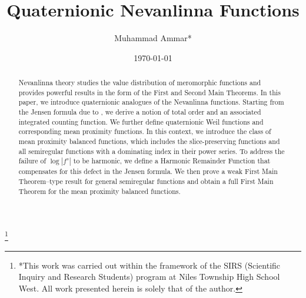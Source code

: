 \documentclass{amsart}
\begin{document}

\title{
Quaternionic Nevanlinna Functions}
 \author[M. Ammar]
{Muhammad Ammar*}
\date{\today}

\thanks{*This work was carried out within the framework of the SIRS (Scientific Inquiry and Research Students) program at Niles Township High School West. All work presented herein is solely that of the author.}

\address{Niles Township High School West, Skokie, IL 60077, United States of America}

\address{Euler Circle, Mountain View, CA 94040, United States of America}


\begin{abstract}
    Nevanlinna theory studies the value distribution of meromorphic functions and provides powerful results in the form of the First and Second Main Theorems. In this paper, we introduce quaternionic analogues of the Nevanlinna functions. Starting from the Jensen formula due to \cite{perottiJensen2019}, we derive a notion of total order and an associated integrated counting function. We further define quaternionic Weil functions and corresponding mean proximity functions. In this context, we introduce the class of mean proximity balanced functions, which includes the slice-preserving functions and all semiregular functions with a dominating index in their power series. To address the failure of $\log|f^s|$ to be harmonic, we define a Harmonic Remainder Function that compensates for this defect in the Jensen formula. We then prove a weak First Main Theorem--type result for general semiregular functions and obtain a full First Main Theorem for the mean proximity balanced functions.  
\end{abstract}
\end{document}
